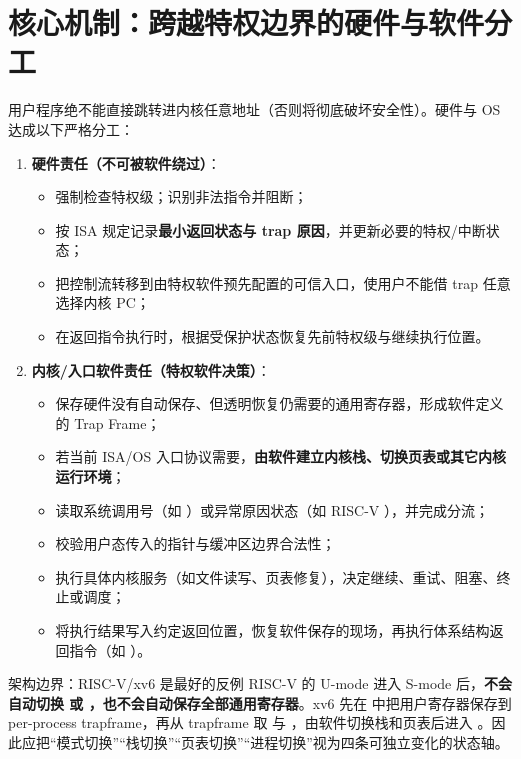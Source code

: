 \documentclass[UTF8,fontset=none,11pt,a4paper]{ctexart}
\begin{document}
\section{核心机制：跨越特权边界的硬件与软件分工}

用户程序绝不能直接跳转进内核任意地址（否则将彻底破坏安全性）。硬件与 OS 达成以下严格分工：
\begin{enumerate}
  \item \textbf{硬件责任（不可被软件绕过）}：
  \begin{itemize}
    \item 强制检查特权级；识别非法指令并阻断；
    \item 按 ISA 规定记录\textbf{最小返回状态与 trap 原因}，并更新必要的特权/中断状态；
    \item 把控制流转移到由特权软件预先配置的可信入口，使用户不能借 trap 任意选择内核 PC；
    \item 在返回指令执行时，根据受保护状态恢复先前特权级与继续执行位置。
  \end{itemize}
  \item \textbf{内核/入口软件责任（特权软件决策）}：
  \begin{itemize}
    \item 保存硬件没有自动保存、但透明恢复仍需要的通用寄存器，形成软件定义的 Trap Frame；
    \item 若当前 ISA/OS 入口协议需要，\textbf{由软件建立内核栈、切换页表或其它内核运行环境}；
    \item 读取系统调用号（如 ）或异常原因状态（如 RISC-V ），并完成分流；
    \item 校验用户态传入的指针与缓冲区边界合法性；
    \item 执行具体内核服务（如文件读写、页表修复），决定继续、重试、阻塞、终止或调度；
    \item 将执行结果写入约定返回位置，恢复软件保存的现场，再执行体系结构返回指令（如 ）。
  \end{itemize}
\end{enumerate}

\begin{warnbox}{架构边界：RISC-V/xv6 是最好的反例}
RISC-V 的 U-mode  进入 S-mode 后，\textbf{不会自动切换  或 ，也不会自动保存全部通用寄存器}。xv6 先在  中把用户寄存器保存到 per-process trapframe，再从 trapframe 取  与 ，由软件切换栈和页表后进入 。因此应把“模式切换”“栈切换”“页表切换”“进程切换”视为四条可独立变化的状态轴。
\end{warnbox}
\end{document}
